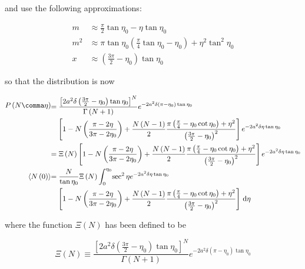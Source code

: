 \documentclass[12pt]{article}
\begin{document}
and use the following approximations:

\begin{equation}
\begin{split}
m &\approx \frac{\pi}{2}\tan\eta_0 - \eta\tan\eta_0 \\
m^2 &\approx \pi\tan\eta_0\left(\frac{\pi}{4}\tan\eta_0 - \eta_0\right) + \eta^2\tan^2\eta_0 \\
x &\approx \left(\frac{3\pi}{2}-\eta_0\right)\tan\eta_0
\end{split}
\end{equation}

so that the distribution is now

\begin{align}
P\left(N\comma\eta\right)
  &\begin{aligned}
     = \frac{\left[2a^2\delta\left(\frac{3\pi}{2}-\eta_0\right)\tan\eta_0\right]^N}{\Gamma\left(N+1\right)}e^{-2a^2\delta\left(\pi-\eta_0\right)\tan\eta_0}
  \end{aligned} \notag \\
  &\quad\begin{aligned}
    \left[1-N\left(\frac{\pi-2\eta}{3\pi-2\eta_0}\right) + \frac{N\left(N-1\right)}{2}\frac{\pi\left(\frac{\pi}{4}-\eta_0\cot\eta_0\right) + \eta^2}{\left(\frac{3\pi}{2}-\eta_0\right)^2}\right]e^{-2a^2\delta\eta\tan\eta_0}
  \end{aligned} \\
  &\begin{aligned}
    = \Xi\left(N\right)\left[1-N\left(\frac{\pi-2\eta}{3\pi-2\eta_0}\right) + \frac{N\left(N-1\right)}{2}\frac{\pi\left(\frac{\pi}{4}-\eta_0\cot\eta_0\right) + \eta^2}{\left(\frac{3\pi}{2}-\eta_0\right)^2}\right]e^{-2a^2\delta\eta\tan\eta_0}
  \end{aligned} \\
\langle N\left(0\right)\rangle
  &\begin{aligned}
    = \frac{N}{\tan\eta_0}\Xi\left(N\right) \int_0^{\eta_0} \! \sec^2\eta e^{-2a^2\delta\eta\tan\eta_0}
  \end{aligned} \notag \\
  &\quad\begin{aligned}
    \left[1-N\left(\frac{\pi-2\eta}{3\pi-2\eta_0}\right) + \frac{N\left(N-1\right)}{2}\frac{\pi\left(\frac{\pi}{4}-\eta_0\cot\eta_0\right) + \eta^2}{\left(\frac{3\pi}{2}-\eta_0\right)^2}\right] \, \mathrm d\eta
  \end{aligned}
\end{align}

where the function $\Xi\left(N\right)$ has been defined to be

\begin{equation}
\Xi\left(N\right) \equiv \frac{\left[2a^2\delta\left(\frac{3\pi}{2}-\eta_0\right)\tan\eta_0\right]^N}{\Gamma\left(N+1\right)}e^{-2a^2\delta\left(\pi-\eta_0\right)\tan\eta_0}
\end{equation}
\end{document}
